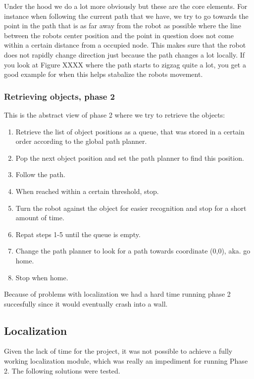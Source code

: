 Under the hood we do a lot more obviously but these are the core elements. For instance when following the current path that we have, we try to go towards the point in the path that is as far away from the robot as possible where the line between the robots center position and the point in question does not come within a certain distance from a occupied node. This makes sure that the robot does not rapidly change direction just because the path changes a lot locally. If you look at Figure XXXX where the path starts to zigzag quite a lot, you get a good example for when this helps stabalize the robots movement. 

\subsubsection{Retrieving objects, phase 2}

This is the abstract view of phase 2 where we try to retrieve the objects:

\begin{enumerate}
\item Retrieve the list of object positions as a queue, that was stored in a certain order according to the global path planner.
\item Pop the next object position and set the path planner to find this position.
\item Follow the path.
\item When reached within a certain threshold, stop.
\item Turn the robot against the object for easier recognition and stop for a short amount of time.
\item Repat steps 1-5 until the queue is empty.
\item Change the path planner to look for a path towards coordinate (0,0), aka. go home.
\item Stop when home.
\end{enumerate}

Because of problems with localization we had a hard time running phase 2 succesfully since it would eventually crash into a wall.

\subsection{Localization}
Given the lack of time for the project, it was not possible to achieve a fully working localization module, which was really an impediment for running Phase 2. The following solutions were tested.

